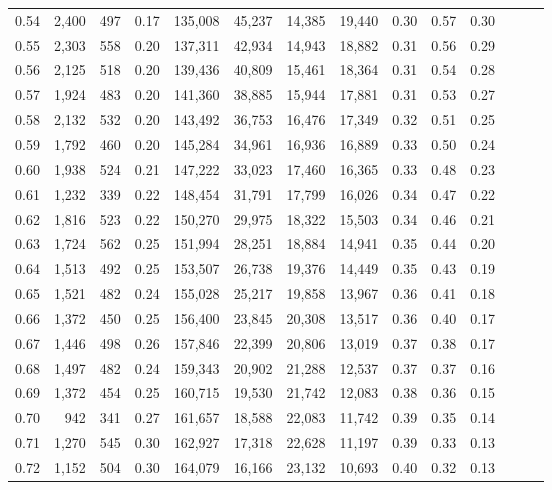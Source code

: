 \begin{tabular}{rrrrrrrrrrrrrr}
0.54 &  2,400 &  497 &  0.17 &  135,008 &   45,237 &  14,385 &  19,440 &  0.30 &  0.57 &      0.30 \\
0.55 &  2,303 &  558 &  0.20 &  137,311 &   42,934 &  14,943 &  18,882 &  0.31 &  0.56 &      0.29 \\
0.56 &  2,125 &  518 &  0.20 &  139,436 &   40,809 &  15,461 &  18,364 &  0.31 &  0.54 &      0.28 \\
0.57 &  1,924 &  483 &  0.20 &  141,360 &   38,885 &  15,944 &  17,881 &  0.31 &  0.53 &      0.27 \\
0.58 &  2,132 &  532 &  0.20 &  143,492 &   36,753 &  16,476 &  17,349 &  0.32 &  0.51 &      0.25 \\
0.59 &  1,792 &  460 &  0.20 &  145,284 &   34,961 &  16,936 &  16,889 &  0.33 &  0.50 &      0.24 \\
0.60 &  1,938 &  524 &  0.21 &  147,222 &   33,023 &  17,460 &  16,365 &  0.33 &  0.48 &      0.23 \\
0.61 &  1,232 &  339 &  0.22 &  148,454 &   31,791 &  17,799 &  16,026 &  0.34 &  0.47 &      0.22 \\
0.62 &  1,816 &  523 &  0.22 &  150,270 &   29,975 &  18,322 &  15,503 &  0.34 &  0.46 &      0.21 \\
0.63 &  1,724 &  562 &  0.25 &  151,994 &   28,251 &  18,884 &  14,941 &  0.35 &  0.44 &      0.20 \\
0.64 &  1,513 &  492 &  0.25 &  153,507 &   26,738 &  19,376 &  14,449 &  0.35 &  0.43 &      0.19 \\
0.65 &  1,521 &  482 &  0.24 &  155,028 &   25,217 &  19,858 &  13,967 &  0.36 &  0.41 &      0.18 \\
0.66 &  1,372 &  450 &  0.25 &  156,400 &   23,845 &  20,308 &  13,517 &  0.36 &  0.40 &      0.17 \\
0.67 &  1,446 &  498 &  0.26 &  157,846 &   22,399 &  20,806 &  13,019 &  0.37 &  0.38 &      0.17 \\
0.68 &  1,497 &  482 &  0.24 &  159,343 &   20,902 &  21,288 &  12,537 &  0.37 &  0.37 &      0.16 \\
0.69 &  1,372 &  454 &  0.25 &  160,715 &   19,530 &  21,742 &  12,083 &  0.38 &  0.36 &      0.15 \\
0.70 &    942 &  341 &  0.27 &  161,657 &   18,588 &  22,083 &  11,742 &  0.39 &  0.35 &      0.14 \\
0.71 &  1,270 &  545 &  0.30 &  162,927 &   17,318 &  22,628 &  11,197 &  0.39 &  0.33 &      0.13 \\
0.72 &  1,152 &  504 &  0.30 &  164,079 &   16,166 &  23,132 &  10,693 &  0.40 &  0.32 &      0.13 \\

\end{tabular}
